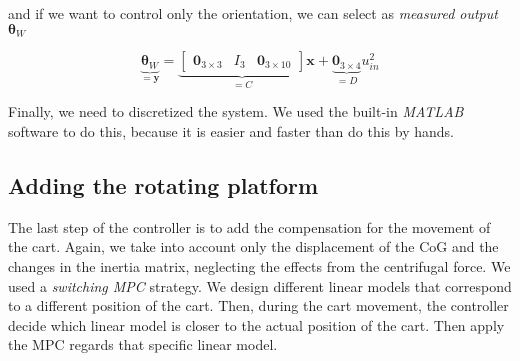 \noindent and if we want to control only the orientation, we can select as \textit{measured output} $\boldsymbol{\theta}_W$

\begin{equation}
	\underbrace{\boldsymbol{\theta}_W}_{=\mathbf{y}} = 
	\underbrace{\begin{bmatrix}
		\mathbf{0}_{3\times 3}  & I_3 & \mathbf{0}_{3\times 10}
	\end{bmatrix}}_{=C} \mathbf{x} + \underbrace{\mathbf{0}_{3\times 4}}_{=D}u_{in}^2
\end{equation}

\noindent Finally, we need to discretized the system. We used the built-in \textit{MATLAB} software to do this, because it is easier and faster than do this by hands.

\subsection{Adding the rotating platform} 

The last step of the controller is to add the compensation for the movement of the cart. Again, we take into account only the displacement of the CoG and the changes in the inertia matrix, neglecting the effects from the centrifugal force. We used a \textit{switching MPC} strategy. We design different linear models that correspond to a different position of the cart. Then, during the cart movement, the controller decide which linear model is closer to the actual position of the cart. Then apply the MPC regards that specific linear model.

